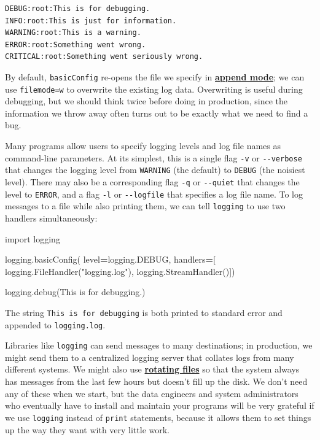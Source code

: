\documentclass[
]{krantz}
\makeatletter
\newenvironment{Shaded}{\begin{snugshade}}{\end{snugshade}}
\newcommand{\ImportTok}[1]{#1}
\newcommand{\NormalTok}[1]{#1}
\newcommand{\OperatorTok}[1]{\textcolor[rgb]{0.81,0.36,0.00}{\textbf{#1}}}
\newcommand{\StringTok}[1]{\textcolor[rgb]{0.31,0.60,0.02}{#1}}
\newenvironment{kframe}{%
\medskip{}
\setlength{\fboxsep}{.8em}
 \def\at@end@of@kframe{}%
 \ifinner\ifhmode%
  \def\at@end@of@kframe{\end{minipage}}%
  \begin{minipage}{\columnwidth}%
 \fi\fi%
 \def\FrameCommand##1{\hskip\@totalleftmargin \hskip-\fboxsep
 \colorbox{shadecolor}{##1}\hskip-\fboxsep
     \hskip-\linewidth \hskip-\@totalleftmargin \hskip\columnwidth}%
 \MakeFramed {\advance\hsize-\width
   \@totalleftmargin\z@ \linewidth\hsize
   \@setminipage}}%
 {\par\unskip\endMakeFramed%
 \at@end@of@kframe}
\renewenvironment{Shaded}{\begin{kframe}}{\end{kframe}}
\newcommand{\gref}[2]{\hyperlink{#2}{\textbf{#1}}}
\makeatother
\begin{document}
\begin{verbatim}
DEBUG:root:This is for debugging.
INFO:root:This is just for information.
WARNING:root:This is a warning.
ERROR:root:Something went wrong.
CRITICAL:root:Something went seriously wrong.
\end{verbatim}

By default,
\texttt{basicConfig} re-opens the file we specify in \gref{append mode}{append\_mode};
we can use \texttt{filemode=\textquotesingle{}w\textquotesingle{}} to overwrite the existing log data.
Overwriting is useful during debugging,
but we should think twice before doing in production,
since the information we throw away often turns out to be
exactly what we need to find a bug.

Many programs allow users to specify logging levels and log file names as command-line parameters.
At its simplest,
this is a single flag \texttt{-v} or \texttt{-\/-verbose} that changes the logging level from \texttt{WARNING} (the default)
to \texttt{DEBUG} (the noisiest level).
There may also be a corresponding flag \texttt{-q} or \texttt{-\/-quiet} that changes the level to \texttt{ERROR},
and a flag \texttt{-l} or \texttt{-\/-logfile} that specifies a log file name.
To log messages to a file while also printing them,
we can tell \texttt{logging} to use two handlers simultaneously:

\begin{Shaded}
\begin{Highlighting}[]
\ImportTok{import}\NormalTok{ logging}


\NormalTok{logging.basicConfig(}
\NormalTok{    level}\OperatorTok{=}\NormalTok{logging.DEBUG,}
\NormalTok{    handlers}\OperatorTok{=}\NormalTok{[}
\NormalTok{        logging.FileHandler(}\StringTok{"logging.log"}\NormalTok{),}
\NormalTok{        logging.StreamHandler()])}

\NormalTok{logging.debug(}\StringTok{\textquotesingle{}This is for debugging.\textquotesingle{}}\NormalTok{)}
\end{Highlighting}
\end{Shaded}

The string \texttt{\textquotesingle{}This\ is\ for\ debugging\textquotesingle{}} is both printed to standard error
and appended to \texttt{logging.log}.

Libraries like \texttt{logging} can send messages to many destinations;
in production,
we might send them to a centralized logging server
that collates logs from many different systems.
We might also use \gref{rotating files}{rotating\_file}
so that the system always has messages from the last few hours
but doesn't fill up the disk.
We don't need any of these when we start,
but the data engineers and system administrators
who eventually have to install and maintain your programs
will be very grateful if we use \texttt{logging} instead of \texttt{print} statements,
because it allows them to set things up the way they want with very little work.
\end{document}
